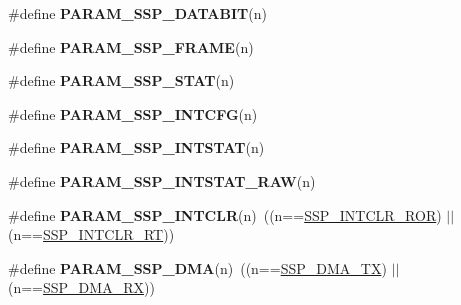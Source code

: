 \begin{DoxyCompactItemize}
\item 
\#define {\bfseries \-P\-A\-R\-A\-M\-\_\-\-S\-S\-P\-\_\-\-D\-A\-T\-A\-B\-I\-T}(n)
\item 
\#define {\bfseries \-P\-A\-R\-A\-M\-\_\-\-S\-S\-P\-\_\-\-F\-R\-A\-M\-E}(n)
\item 
\#define {\bfseries \-P\-A\-R\-A\-M\-\_\-\-S\-S\-P\-\_\-\-S\-T\-A\-T}(n)
\item 
\#define {\bfseries \-P\-A\-R\-A\-M\-\_\-\-S\-S\-P\-\_\-\-I\-N\-T\-C\-F\-G}(n)
\item 
\#define {\bfseries \-P\-A\-R\-A\-M\-\_\-\-S\-S\-P\-\_\-\-I\-N\-T\-S\-T\-A\-T}(n)
\item 
\#define {\bfseries \-P\-A\-R\-A\-M\-\_\-\-S\-S\-P\-\_\-\-I\-N\-T\-S\-T\-A\-T\-\_\-\-R\-A\-W}(n)
\item 
\hypertarget{group___s_s_p___private___macros_ga2f7034b2420cb7163a93f6a101a5e660}{\#define {\bfseries \-P\-A\-R\-A\-M\-\_\-\-S\-S\-P\-\_\-\-I\-N\-T\-C\-L\-R}(n)~((n==\hyperlink{group___s_s_p___public___macros_gab79665cc09989a9730abb6b5452df1d7}{\-S\-S\-P\-\_\-\-I\-N\-T\-C\-L\-R\-\_\-\-R\-O\-R}) $|$$|$ (n==\hyperlink{group___s_s_p___public___macros_ga36b024118d27e68540e8e403b897ed75}{\-S\-S\-P\-\_\-\-I\-N\-T\-C\-L\-R\-\_\-\-R\-T}))}\label{group___s_s_p___private___macros_ga2f7034b2420cb7163a93f6a101a5e660}

\item 
\hypertarget{group___s_s_p___private___macros_ga871436ce24c4d561060ecc7a56a508a5}{\#define {\bfseries \-P\-A\-R\-A\-M\-\_\-\-S\-S\-P\-\_\-\-D\-M\-A}(n)~((n==\hyperlink{group___s_s_p___public___macros_ga442c2b693b567292aaa17bdba6789094}{\-S\-S\-P\-\_\-\-D\-M\-A\-\_\-\-T\-X}) $|$$|$ (n==\hyperlink{group___s_s_p___public___macros_gac294ff35d73ad16084bd157fec3bcfc6}{\-S\-S\-P\-\_\-\-D\-M\-A\-\_\-\-R\-X}))}\label{group___s_s_p___private___macros_ga871436ce24c4d561060ecc7a56a508a5}

\end{DoxyCompactItemize}


